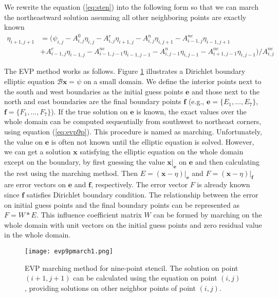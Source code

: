 We rewrite the equation (\ref{eq:sten}) into the following form so that we can march the northeastward solution assuming all other neighboring points are exactly known
\begin{align}
\label{eq:evp9p}
\eta_{i+1,j+1} &= (\psi_{i,j} - A_{i,j}^0\eta_{i,j}-A_{i,j}^e\eta_{i+1,j} -A_{i,j}^n\eta_{i,j+1}-A_{i-1,j}^{ne}\eta_{i-1,j+1}  \nonumber\\
&+A_{i-1,j}^e\eta_{i-1,j} -A_{i-1,j-1}^{ne}\eta_{i-1,j-1}-A_{i,j-1}^n\eta_{i,j-1}- A_{i+1,j-1}^{ne}\eta_{i,j-1} )/A_{i,j}^{ne}
\end{align}

The EVP method works as follows. Figure \ref{fig:evp9p} illustrates a Dirichlet boundary elliptic equation $\mathcal{B}\textbf{x} = \psi$ on a small domain.  We define the interior points next to the south and west boundaries as the initial guess points $\textbf{e}$ and those next to the north and east boundaries are the final boundary points $\textbf{f}$ (e.g., $\textbf{e}= \{E_1, \dots, E_7\}$, $\textbf{f}= \{F_1, \dots, F_7\}$).  If the true solution on $\textbf{e}$ is
known, the exact values over the whole domain can be computed sequentially from southwest to northeast corners, using equation
(\ref{eq:evp9p}). This procedure is named as marching. Unfortunately, the value on $\textbf{e}$ is often not known until the elliptic equation is solved.  However, we can get a solution $\textbf{x}$ satisfying the elliptic equation on the whole domain except on the boundary, by first guessing the value
$\textbf{x}|_\textbf{e}$ on $\textbf{e}$ and then calculating the rest using the marching method.  Then $E=(\textbf{x} -\eta)|_\textbf{e}$
and $F=(\textbf{x} -\eta)|_\textbf{f}$ are error vectors on $\textbf{e}$ and $\textbf{f}$, respectively.  The error vector $F$ is already known since $\textbf{f}$  satisfies Dirichlet boundary condition.  The relationship between the error on initial guess points and the final boundary points can be represented as $F=W*E$.  This influence coefficient matrix $W$ can be formed by marching on the whole domain with unit vectors on the initial guess points and zero residual value in the whole domain.


\begin {figure}[!htbp]
\centering
\texttt{[image: evp9pmarch1.png]}
\caption []{EVP marching method for nine-point stencil. The solution on point $(i+1,j+1)$ can be calculated using the equation on point $(i,j)$, providing solutions on other neighbor points of point $(i,j)$.  \label {fig:evp9p}}
\end {figure}
